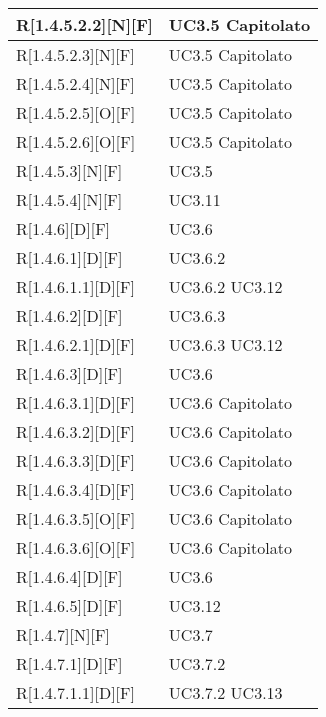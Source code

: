 \begin{longtable}{X | X}
\hline
R[1.4.5.2.2][N][F] & UC3.5 \newline Capitolato \\
\hline
R[1.4.5.2.3][N][F] & UC3.5 \newline Capitolato \\
\hline
R[1.4.5.2.4][N][F] & UC3.5 \newline Capitolato \\
\hline
R[1.4.5.2.5][O][F] & UC3.5 \newline Capitolato \\
\hline
R[1.4.5.2.6][O][F] & UC3.5 \newline Capitolato \\
\hline
R[1.4.5.3][N][F] & UC3.5 \\
\hline
R[1.4.5.4][N][F] & UC3.11 \\
\hline
R[1.4.6][D][F] & UC3.6 \\
\hline
R[1.4.6.1][D][F] & UC3.6.2 \\
\hline
R[1.4.6.1.1][D][F] & UC3.6.2 \newline UC3.12 \\
\hline
R[1.4.6.2][D][F] & UC3.6.3 \\
\hline
R[1.4.6.2.1][D][F] & UC3.6.3 \newline UC3.12 \\
\hline
R[1.4.6.3][D][F] & UC3.6 \\
\hline
R[1.4.6.3.1][D][F] & UC3.6 \newline Capitolato \\
\hline
R[1.4.6.3.2][D][F] & UC3.6 \newline Capitolato \\
\hline
R[1.4.6.3.3][D][F] & UC3.6 \newline Capitolato \\
\hline
R[1.4.6.3.4][D][F] & UC3.6 \newline Capitolato \\
\hline
R[1.4.6.3.5][O][F] & UC3.6 \newline Capitolato \\
\hline
R[1.4.6.3.6][O][F] & UC3.6 \newline Capitolato \\
\hline
R[1.4.6.4][D][F] & UC3.6 \\
\hline
R[1.4.6.5][D][F] & UC3.12 \\
\hline
R[1.4.7][N][F] & UC3.7 \\
\hline
R[1.4.7.1][D][F] & UC3.7.2 \\
\hline
R[1.4.7.1.1][D][F] & UC3.7.2 \newline UC3.13 \\

\end{longtable}
